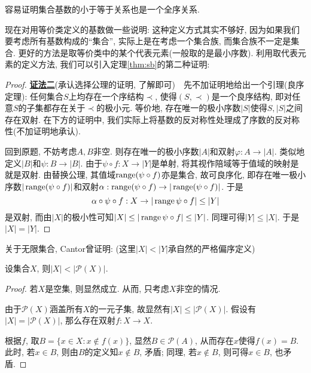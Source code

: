 容易证明集合基数的小于等于关系也是一个全序关系. 

现在对用等价类定义的基数做一些说明: 这种定义方式其实不够好, 因为如果我们要考虑所有基数构成的“集合”, 实际上是在考虑一个集合族, 而集合族不一定是集合. 更好的方法是取等价类中的某个代表元素(一般取的是最小序数). 利用取代表元素的定义方法, 我们可以引入定理\ref{thm:sb}的第二种证明: 

\begin{proof}
	\underline{\textbf{证法二}}(承认选择公理的证明, 了解即可)~~先不加证明地给出一个引理(良序定理): 任何集合$S$上均存在一个序结构$\prec$, 使得$(S,\prec)$是一个良序结构, 即对任意$S$的子集都存在关于$\prec$的极小元. 等价地, 存在唯一的极小序数$|S|$使得$S,|S|$之间存在双射. 在下方的证明中, 我们实际上将基数的反对称性处理成了序数的反对称性(不加证明地承认). 
	
	回到原题, 不妨考虑$A,B$非空. 则存在唯一的极小序数$|A|$和双射$\varphi :A \to |A|$. 类似地定义$|B|$和$\psi :B \to |B|$. 由于$\psi \circ f:X \to |Y|$是单射, 将其视作陪域等于值域的映射是就是双射. 由替换公理, 其值域$\operatorname{range} (\psi \circ f)$亦是集合, 故可良序化, 即存在唯一极小序数$|\operatorname{range} (\psi \circ f)|$和双射$\alpha :\operatorname{range} (\psi \circ f) \to |\operatorname{range} (\psi \circ f)|$. 于是$$\alpha \circ \psi \circ f:X \to |\operatorname{range} \psi \circ f| \leq |Y|$$
	是双射, 而由$|X|$的极小性可知$|X| \leq |\operatorname{range} \psi \circ f| \leq |Y|$. 同理可得$|Y| \leq |X|$. 于是$|X|=|Y|$. 
\end{proof}



关于无限集合, Cantor曾证明: (这里$|X|<|Y|$承自然的严格偏序定义)

\begin{theorem}{}
	设集合$X$, 则$|X|< |\mathcal{P}(X)|$.
\end{theorem}
\begin{proof}
	若$X$是空集, 则显然成立. 从而, 只考虑$X$非空的情况. 
	
	由于$\mathcal{P}(X)$涵盖所有$X$的一元子集, 故显然有$|X| \leq |\mathcal{P}(X)|$. 假设有$|X| = | \mathcal{P}(X)|$, 那么存在双射$f: X \to X$. 
	
	根据$f$, 取$B=\{ x \in X: x \notin f(x) \}$, 显然$B \in \mathcal{P}(A)$, 从而存在$x$使得$f(x)=B$. 此时, 若$x \in B$, 则由$B$的定义知$x \notin B$, 矛盾; 同理, 若$x \notin B$, 则可得$x \in B$, 也矛盾. 
\end{proof}


